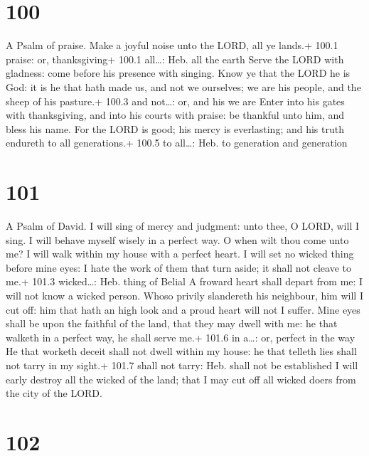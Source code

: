 \hypertarget{section-99}{%
\section{100}\label{section-99}}

A Psalm of praise.  Make a joyful noise unto the LORD, all
ye lands.+ 100.1 praise: or, thanksgiving+ 100.1 all\ldots: Heb. all the
earth  Serve the LORD with gladness: come before his
presence with singing.  Know ye that the LORD he is God: it
is he that hath made us, and not we ourselves; we are his people, and
the sheep of his pasture.+ 100.3 and not\ldots: or, and his we are
 Enter into his gates with thanksgiving, and into his courts
with praise: be thankful unto him, and bless his name.  For
the LORD is good; his mercy is everlasting; and his truth endureth to
all generations.+ 100.5 to all\ldots: Heb. to generation and generation

\hypertarget{section-100}{%
\section{101}\label{section-100}}

A Psalm of David.  I will sing of mercy and judgment: unto
thee, O LORD, will I sing.  I will behave myself wisely in a
perfect way. O when wilt thou come unto me? I will walk within my house
with a perfect heart.  I will set no wicked thing before
mine eyes: I hate the work of them that turn aside; it shall not cleave
to me.+ 101.3 wicked\ldots: Heb. thing of Belial  A froward
heart shall depart from me: I will not know a wicked person.
 Whoso privily slandereth his neighbour, him will I cut off:
him that hath an high look and a proud heart will not I suffer.
 Mine eyes shall be upon the faithful of the land, that they
may dwell with me: he that walketh in a perfect way, he shall serve me.+
101.6 in a\ldots: or, perfect in the way  He that worketh
deceit shall not dwell within my house: he that telleth lies shall not
tarry in my sight.+ 101.7 shall not tarry: Heb. shall not be established
 I will early destroy all the wicked of the land; that I may
cut off all wicked doers from the city of the LORD.

\hypertarget{section-101}{%
\section{102}\label{section-101}}

